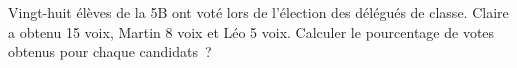 \documentclass[exercice]{thedocument}%
\begin{document}
%
Vingt-huit élèves de la 5B ont voté lors de l'élection des délégués
de classe. Claire a obtenu 15 voix, Martin 8 voix et Léo 5 voix.\vskip5pt
\noindent Calculer le pourcentage de votes obtenus pour chaque candidats~?
\end{document}
